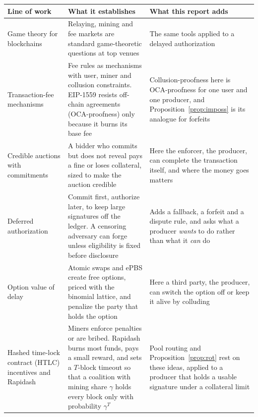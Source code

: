 \documentclass[11pt]{article}
\renewcommand{\arraystretch}{1.12}
\begin{document}
\begin{table}[htbp]\centering\scriptsize
\renewcommand{\arraystretch}{1.15}
\begin{tabularx}{\textwidth}{|>{\raggedright\arraybackslash}p{3.3cm}|Y|Y|}
\hline
{}Line of work & What it establishes & What this report adds \\
\hline
Game theory for blockchains~\cite{babaioff2012redballoons,eyal2014majority,kiayias2016mining,carlsten2016instability,huberman2021monopoly,leshno2020axiomatic} & Relaying, mining and fee markets are standard game-theoretic questions at top venues & The same tools applied to a delayed authorization \\
\hline
Transaction-fee mechanisms~\cite{roughgarden2021tfm,chungshi2023,chung2024collusion,gafni2024barriers} & Fee rules as mechanisms with user, miner and collusion constraints. EIP-1559 resists off-chain agreements (OCA-proofness) only because it burns its base fee & Collusion-proofness here is OCA-proofness for one user and one producer, and Proposition~\ref{prop:imposs} is its analogue for forfeits \\
\hline
Credible auctions with commitments~\cite{akbarpour2020credible,ferreira2020credible,chitra2024broadcast,ganesh2025matroids} & A bidder who commits but does not reveal pays a fine or loses collateral, sized to make the auction credible & Here the enforcer, the producer, can complete the transaction itself, and where the money goes matters \\
\hline
Deferred authorization~\cite{finlowbates2026,lie2026finality} & Commit first, authorize later, to keep large signatures off the ledger. A censoring adversary can forge unless eligibility is fixed before disclosure & Adds a fallback, a forfeit and a dispute rule, and asks what a producer \emph{wants} to do rather than what it \emph{can} do \\
\hline
Option value of delay~\cite{han2019optionality,crr1979,xu2021htlc,xue2021hedging,mazumdar2022quick,dubovitskaya2021packetized,mazorra2025epbs} & Atomic swaps and ePBS create free options, priced with the binomial lattice, and penalize the party that holds the option & Here a third party, the producer, can switch the option off or keep it alive by colluding \\
\hline
Hashed time-lock contract (HTLC) incentives and Rapidash~\cite{tsabary2021mad,wadhwa2023hehtlc,chung2025rapidash} & Miners enforce penalties or are bribed. Rapidash burns most funds, pays a small reward, and sets a $T$-block timeout so that a coalition with mining share $\gamma$ holds every block only with probability $\gamma^T$ & Pool routing and Proposition~\ref{prop:rot} rest on these ideas, applied to a producer that holds a usable signature under a collateral limit \\

\end{tabularx}
\end{table}
\end{document}
